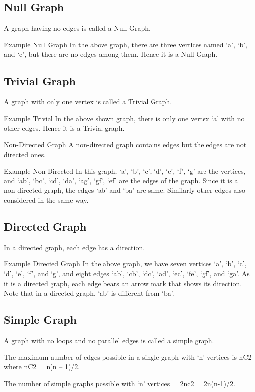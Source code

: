 ﻿%

\subsection{Null Graph}
A graph having no edges is called a Null Graph.

Example
Null Graph
In the above graph, there are three vertices named ‘a’, ‘b’, and ‘c’, but there are no edges among them. Hence it is a Null Graph.

\subsection{Trivial Graph}
A graph with only one vertex is called a Trivial Graph.

Example
Trivial
In the above shown graph, there is only one vertex ‘a’ with no other edges. Hence it is a Trivial graph.

Non-Directed Graph
A non-directed graph contains edges but the edges are not directed ones.

Example
Non-Directed
In this graph, ‘a’, ‘b’, ‘c’, ‘d’, ‘e’, ‘f’, ‘g’ are the vertices, and ‘ab’, ‘bc’, ‘cd’, ‘da’, ‘ag’, ‘gf’, ‘ef’ are the edges of the graph. Since it is a non-directed graph, the edges ‘ab’ and ‘ba’ are same. Similarly other edges also considered in the same way.

\subsection{Directed Graph}
In a directed graph, each edge has a direction.

Example
Directed Graph
In the above graph, we have seven vertices ‘a’, ‘b’, ‘c’, ‘d’, ‘e’, ‘f’, and ‘g’, and eight edges ‘ab’, ‘cb’, ‘dc’, ‘ad’, ‘ec’, ‘fe’, ‘gf’, and ‘ga’. As it is a directed graph, each edge bears an arrow mark that shows its direction. Note that in a directed graph, ‘ab’ is different from ‘ba’.

\subsection{Simple Graph}
A graph with no loops and no parallel edges is called a simple graph.

The maximum number of edges possible in a single graph with ‘n’ vertices is nC2 where nC2 = n(n – 1)/2.

The number of simple graphs possible with ‘n’ vertices = 2nc2 = 2n(n-1)/2.

